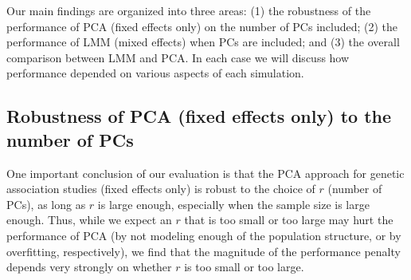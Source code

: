 \documentclass[11pt]{article}
\begin{document}







Our main findings are organized into three areas:
(1) the robustness of the performance of PCA (fixed effects only) on the number of PCs included;
(2) the performance of LMM (mixed effects) when PCs are included; and
(3) the overall comparison between LMM and PCA.
In each case we will discuss how performance depended on various aspects of each simulation.

\subsection{Robustness of PCA (fixed effects only) to the number of PCs}

One important conclusion of our evaluation is that the PCA approach for genetic association studies (fixed effects only) is robust to the choice of $r$ (number of PCs), as long as $r$ is large enough, especially when the sample size is large enough.
Thus, while we expect an $r$ that is too small or too large may hurt the performance of PCA (by not modeling enough of the population structure, or by overfitting, respectively), we find that the magnitude of the performance penalty depends very strongly on whether $r$ is too small or too large.
\end{document}
